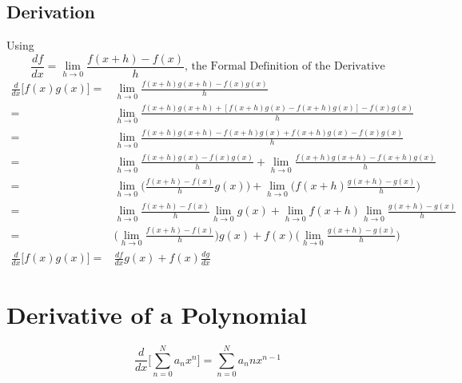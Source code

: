 \documentclass[11pt]{book}
\begin{document}
\subsection{Derivation}
Using
\[\frac{df}{dx} = \lim_{h\to0}\frac{f(x+h) -f(x)}{h} \text{, the Formal Definition of the Derivative}\]
\begin{align*}
\frac{d}{dx}\bigg[f(x)g(x) \bigg] =& \lim_{h\to0}\frac{f(x+h)g(x+h) -f(x)g(x)}{h} \\
=& \lim_{h\to0}\frac{f(x+h)g(x+h) + [f(x+h)g(x) - f(x+h)g(x)] - f(x)g(x)}{h} \\
=& \lim_{h\to0}\frac{f(x+h)g(x+h) - f(x+h)g(x) + f(x+h)g(x) - f(x)g(x)}{h} \\
=& \lim_{h\to0}\frac{f(x+h)g(x) - f(x)g(x)}{h} + \lim_{h\to0}\frac{f(x+h)g(x+h) - f(x+h)g(x)}{h} \\
=& \lim_{h\to0}\bigg(\frac{f(x+h) - f(x)}{h}g(x)\bigg) + \lim_{h\to0}\bigg(f(x+h)\frac{g(x+h) - g(x)}{h}\bigg) \\
=& \lim_{h\to0}\frac{f(x+h) - f(x)}{h}\lim_{h\to0}g(x) + \lim_{h\to0}f(x+h)\lim_{h\to0}\frac{g(x+h) - g(x)}{h} \\
=& \bigg(\lim_{h\to0}\frac{f(x+h) - f(x)}{h}\bigg)g(x) + f(x)\bigg(\lim_{h\to0}\frac{g(x+h) - g(x)}{h}\bigg) \\
\frac{d}{dx}\bigg[f(x)g(x) \bigg] =& \frac{df}{dx}g(x) + f(x)\frac{dg}{dx}
\end{align*}

\section{Derivative of a Polynomial}
\[ \frac{d}{dx}\bigg[\sum\limits_{n=0}^N{a_n x^n} \bigg] = \sum\limits_{n=0}^N{a_n n x^{n-1}}\]
\end{document}
